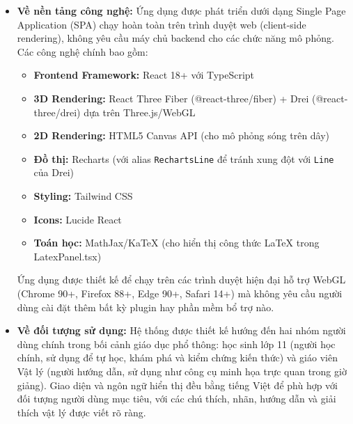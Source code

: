 \begin{itemize}
    \item \textbf{Về nền tảng công nghệ:} Ứng dụng được phát triển dưới dạng Single Page Application (SPA) chạy hoàn toàn trên trình duyệt web (client-side rendering), không yêu cầu máy chủ backend cho các chức năng mô phỏng. Các công nghệ chính bao gồm:
    \begin{itemize}
        \item \textbf{Frontend Framework:} React 18+ với TypeScript
        \item \textbf{3D Rendering:} React Three Fiber (@react-three/fiber) + Drei (@react-three/drei) dựa trên Three.js/WebGL
        \item \textbf{2D Rendering:} HTML5 Canvas API (cho mô phỏng sóng trên dây)
        \item \textbf{Đồ thị:} Recharts (với alias \texttt{RechartsLine} để tránh xung đột với \texttt{Line} của Drei)
        \item \textbf{Styling:} Tailwind CSS
        \item \textbf{Icons:} Lucide React
        \item \textbf{Toán học:} MathJax/KaTeX (cho hiển thị công thức LaTeX trong LatexPanel.tsx)
    \end{itemize}
    Ứng dụng được thiết kế để chạy trên các trình duyệt hiện đại hỗ trợ WebGL (Chrome 90+, Firefox 88+, Edge 90+, Safari 14+) mà không yêu cầu người dùng cài đặt thêm bất kỳ plugin hay phần mềm bổ trợ nào.
    
    \item \textbf{Về đối tượng sử dụng:} Hệ thống được thiết kế hướng đến hai nhóm người dùng chính trong bối cảnh giáo dục phổ thông: học sinh lớp 11 (người học chính, sử dụng để tự học, khám phá và kiểm chứng kiến thức) và giáo viên Vật lý (người hướng dẫn, sử dụng như công cụ minh họa trực quan trong giờ giảng). Giao diện và ngôn ngữ hiển thị đều bằng tiếng Việt để phù hợp với đối tượng người dùng mục tiêu, với các chú thích, nhãn, hướng dẫn và giải thích vật lý được viết rõ ràng.
    

\end{itemize}
